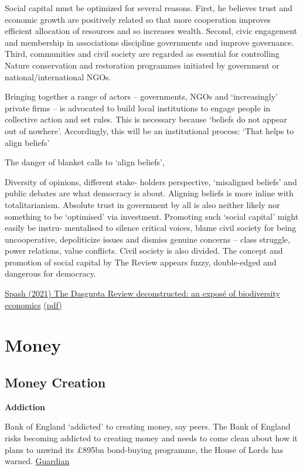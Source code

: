 \documentclass[
]{book}
\begin{document}
Social capital must be optimized for several reasons. First,
he believes trust and economic growth are positively related so that more cooperation improves
efficient allocation of resources and so increases wealth. Second, civic engagement and membership
in associations discipline governments and improve governance. Third, communities and civil
society are regarded as essential for controlling Nature conservation and restoration programmes
initiated by government or national/international NGOs.

Bringing together a range of actors -- governments,
NGOs and `increasingly' private firms -- is advocated to build local institutions to engage people
in collective action and set rules. This is necessary because `beliefs do not appear out of nowhere'.
Accordingly, this will be an institutional process: `That helps to align beliefs'

The danger of blanket calls to `align beliefs',

Diversity of opinions, different stake-
holders perspective, `misaligned beliefs' and public debates are what democracy is about. Aligning
beliefs is more inline with totalitarianism. Absolute trust in government by all is also neither likely
nor something to be `optimised' via investment. Promoting such `social capital' might easily be instru-
mentalised to silence critical voices, blame civil society for being uncooperative, depoliticize issues and
dismiss genuine concerns -- class struggle, power relations, value conflicts. Civil society is also divided.
The concept and promotion of
social capital by The Review appears fuzzy, double-edged and dangerous for democracy.

\href{https://www.tandf\%20online.com/doi/full/10.1080/14747731.2021.1929007}{Spash (2021) The Dasgupta Review deconstructed: an exposé of biodiversity economics}
\href{pdf/Spash_2021_Dasgupta_Deconstructed.pdf}{(pdf)}

\hypertarget{money}{%
\chapter{Money}\label{money}}

\hypertarget{money-creation}{%
\section{Money Creation}\label{money-creation}}

\textbf{Addiction}

Bank of England `addicted' to creating money, say peers.
The Bank of England risks becoming addicted to creating money and needs to come clean about how it plans to unwind its £895bn bond-buying programme, the House of Lords has warned.
\href{https://www.theguardian.com/business/2021/jul/16/bank-of-england-creating-money-lords-quantitative-easing}{Guardian}
\end{document}
